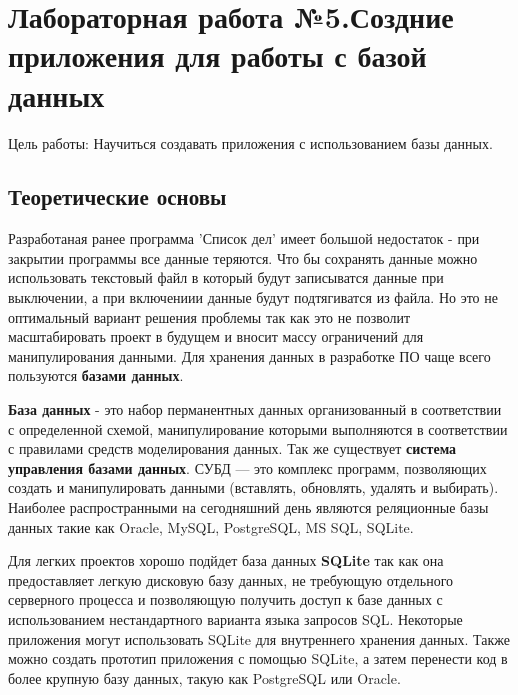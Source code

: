 \documentclass[a4paper]{article}
\begin{document}
\newpage
\section{Лабораторная работа №5.\newline Создние приложения для работы с базой данных}

Цель работы: Научиться создавать приложения с использованием базы данных.

\subsection{Теоретические основы}

Разработаная ранее программа 'Список дел' имеет большой недостаток - при закрытии программы все данные теряются. Что бы сохранять данные можно использовать текстовый файл в который будут записыватся данные при выключении, а при включениии данные будут подтягиватся из файла. Но это не оптимальный вариант решения проблемы так как это не позволит масштабировать проект в будущем и вносит массу ограничений для манипулирования данными. Для хранения данных в разработке ПО чаще всего пользуются \textbf{базами данных}.

\textbf{База данных} - это набор перманентных данных организованный в соответствии с определенной схемой, манипулирование которыми выполняются в соответствии с правилами средств моделирования данных. Так же существует \textbf{система управления базами данных}. СУБД --- это комплекс программ, позволяющих создать и манипулировать данными (вставлять, обновлять, удалять и выбирать). Наиболее распространными на сегодняшний день являются реляционные базы данных такие как Oracle, MySQL, PostgreSQL, MS SQL, SQLite.

Для легких проектов хорошо подйдет база данных \textbf{SQLite} так как она предоставляет легкую дисковую базу данных, не требующую отдельного серверного процесса и позволяющую получить доступ к базе данных с использованием нестандартного варианта языка запросов SQL. Некоторые приложения могут использовать SQLite для внутреннего хранения данных. Также можно создать прототип приложения с помощью SQLite, а затем перенести код в более крупную базу данных, такую как PostgreSQL или Oracle.
\end{document}
